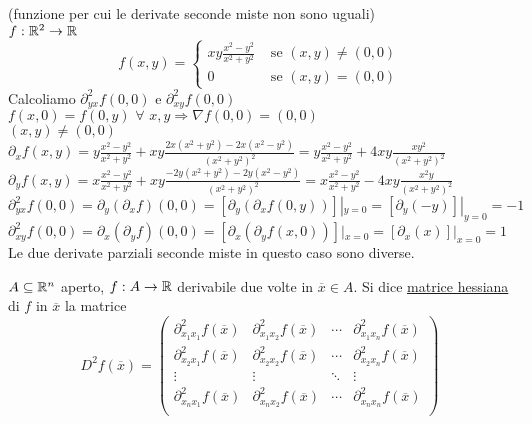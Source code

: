 \begin{exbar}
\begin{example}
	(funzione per cui le derivate seconde miste non sono uguali)\\
	$f:\mathbb{R}^2\rightarrow\mathbb{R}$\\
	\begin{equation*}
		f(x,y)=\begin{cases}
			xy\frac{x^2-y^2}{x^2+y^2}&\text{  se  }(x,y)\neq (0,0)\\
			0&\text{  se  }(x,y)=(0,0)
		\end{cases}
	\end{equation*}
	Calcoliamo $\partial_{yx}^2f(0,0)$ e $\partial_{xy}^2f(0,0)$\\
	$f(x,0)=f(0,y)\,\, \forall\,\, x,y \Rightarrow \nabla f(0,0)=(0,0)$\\
	$(x,y)\neq (0,0)$\\
	$\partial_x f(x,y)=y \frac{x^2-y^2}{x^2+y^2}+xy\frac{2x(x^2+y^2)-2x(x^2-y^2)}{(x^2+y^2)^2}= y \frac{x^2-y^2}{x^2+y^2}+4xy\frac{xy^2}{(x^2+y^2)^2}$\\
	$\partial_yf(x,y)=x\frac{x^2-y^2}{x^2+y^2}+xy\frac{-2y(x^2+y^2)-2y(x^2-y^2)}{(x^2+y^2)^2}=x\frac{x^2-y^2}{x^2+y^2}-4xy\frac{x^2y}{(x^2+y^2)^2}$\\
	$\partial_{yx}^2f(0,0)=\partial_y (\partial_x f)(0,0)=[\partial_y(\partial_xf(0,y))]|_{y=0}=[\partial_y(-y)]|_{y=0}=-1$\\
	$\partial_{xy}^2f(0,0)=\partial_x(\partial_yf)(0,0)= [\partial_x(\partial_yf(x,0))]|_{x=0}=[\partial_x(x)]|_{x=0}=1$\\
	Le due derivate parziali seconde miste in questo caso sono diverse.
\end{example}
\end{exbar}


\begin{definition}
	$A \subseteq \mathbb{R}^n$ aperto, $f: A \rightarrow \mathbb{R}$ derivabile due volte in $\overline{x}\in A$. Si dice \underline{matrice hessiana} di $f$ in $\overline{x}$ la matrice
	\begin{equation*}
		D^2f(\overline{x})=\begin{pmatrix}
			\partial_{x_1x_1}^2f(\overline{x})& \partial_{x_1x_2}^2f(\overline{x})  & \cdots & \partial_{x_1x_n}^2f(\overline{x})\\
			\partial_{x_2x_1}^2f(\overline{x})& \partial_{x_2x_2}^2f(\overline{x}) & \cdots & \partial_{x_2x_n}^2f(\overline{x})\\
			\vdots&\vdots & \ddots &\vdots \\
			\partial_{x_nx_1}^2f(\overline{x})& \partial_{x_nx_2}^2f(\overline{x})& \cdots & \partial_{x_nx_n}^2f(\overline{x}) \\
		\end{pmatrix}
	\end{equation*}
\end{definition}


